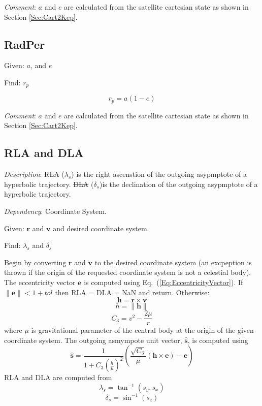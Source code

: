 \noindent \textit{Comment}:  $a$ and $e$ are calculated from the
satellite cartesian state as shown in Section \ref{Sec:Cart2Kep}.

\subsection{RadPer}

Given:  $a$, and $e$

\noindent Find:  $r_p$

\begin{equation}
    r_p = a(1-e)
\end{equation}

\noindent \textit{Comment}:  $a$ and $e$ are calculated from the
satellite cartesian state as shown in Section \ref{Sec:Cart2Kep}.

\subsection{RLA and DLA}  

\noindent \textit{Description}: \st{RLA} ($\lambda_s$) is the right ascenstion of the outgoing
asypmptote of a hyperbolic trajectory.  \st{DLA} ($\delta_s$)is the declination of the outgoing
asypmptote of a hyperbolic trajectory.

\noindent \textit{Dependency}:  Coordinate System.

\noindent Given:  $\mathbf{r}$ and $\mathbf{v}$ and desired coordinate system.

\noindent Find:  $\lambda_s$ and $\delta_s$

Begin by converting $\mathbf{r}$ and $\mathbf{v}$ to the desired coordinate system (an excpeption
is thrown if the origin of the requested coordinate system is not a celestial body).
The eccentricity vector $\mathbf{e}$ is computed using Eq.~(\ref{Eq:EccentricityVector}).
If $\|\mathbf{e}\| < 1 + tol$ then RLA = DLA = NaN and return. Otherwise:
%
\begin{equation}
    \mathbf{h} = \mathbf{r} \times \mathbf{v}
\end{equation}
%
\begin{equation}
    h = \| \mathbf{h} \|
\end{equation}
%
\begin{equation}
   C_3 = v^2 - \frac{2\mu}{r}
\end{equation}
%
where $\mu$ is gravitational parameter of the central body at the origin of the given coordinate system.   The outgoing asmympote unit vector, $\hat{\mathbf{s}} $, is computed using
%
\begin{equation}
   \hat{\mathbf{s}} = \frac{1}{ 1 + C_3 \displaystyle\left(\frac{h}{\mu}\right)^2}\left(   \frac{\sqrt{C_3}}{\mu} \left(\mathbf{h} \times \mathbf{e} \right) - \mathbf{e} \right)
\end{equation}
%
RLA and DLA are computed from
%
\begin{equation}
    \lambda_s = \tan^{-1}(s_y,s_x)
\end{equation}
%
\begin{equation}
    \delta_s = \sin^{-1}(s_z)
\end{equation}

